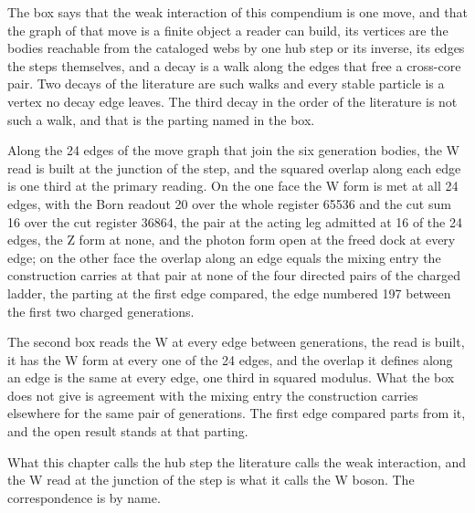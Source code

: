 The box says that the weak interaction of this compendium is one move, and that the graph of that move is a finite object a reader can build, its vertices are the bodies reachable from the cataloged webs by one hub step or its inverse, its edges the steps themselves, and a decay is a walk along the edges that free a cross-core pair. Two decays of the literature are such walks and every stable particle is a vertex no decay edge leaves. The third decay in the order of the literature is not such a walk, and that is the parting named in the box.
\begin{chwall}\label{box:VI-1-hub-step-as-the-weak-interaction:2}
Along the 24 edges of the move graph that join the six generation bodies, the W read is built at the junction of the step, and the squared overlap along each edge is one third at the primary reading. On the one face the W form is met at all 24 edges, with the Born readout 20 over the whole register 65536 and the cut sum 16 over the cut register 36864, the pair at the acting leg admitted at 16 of the 24 edges, the Z form at none, and the photon form open at the freed dock at every edge; on the other face the overlap along an edge equals the mixing entry the construction carries at that pair at none of the four directed pairs of the charged ladder, the parting at the first edge compared, the edge numbered 197 between the first two charged generations.
\end{chwall}
The second box reads the W at every edge between generations, the read is built, it has the W form at every one of the 24 edges, and the overlap it defines along an edge is the same at every edge, one third in squared modulus. What the box does not give is agreement with the mixing entry the construction carries elsewhere for the same pair of generations. The first edge compared parts from it, and the open result stands at that parting.
\begin{chbridge}
What this chapter calls the hub step the literature calls the weak interaction, and the W read at the junction of the step is what it calls the W boson. The correspondence is by name.
\end{chbridge}
